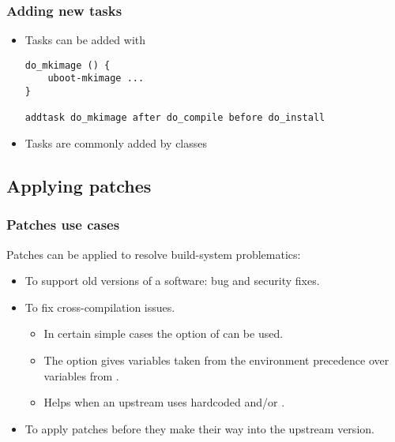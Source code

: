 \begin{frame}[fragile]
  \frametitle{Adding new tasks}
  \begin{itemize}
  \item Tasks can be added with 
  \begin{block}{}
    \begin{verbatim}
do_mkimage () {
    uboot-mkimage ...
}

addtask do_mkimage after do_compile before do_install
    \end{verbatim}
  \end{block}
  \item Tasks are commonly added by classes
  \end{itemize}
\end{frame}

\subsection{Applying patches}

\begin{frame}
  \frametitle{Patches use cases}
  Patches can be applied to resolve build-system problematics:
  \begin{itemize}
    \item To support old versions of a software: bug and security
      fixes.
    \item To fix cross-compilation issues.
      \begin{itemize}
        \item In certain simple cases the  option of
           can be used.
        \item The  option gives variables taken from the
          environment precedence over variables from .
        \item Helps when an upstream  uses hardcoded
           and/or .
      \end{itemize}
    \item To apply patches before they make their way into the upstream
      version.
  \end{itemize}
\end{frame}

